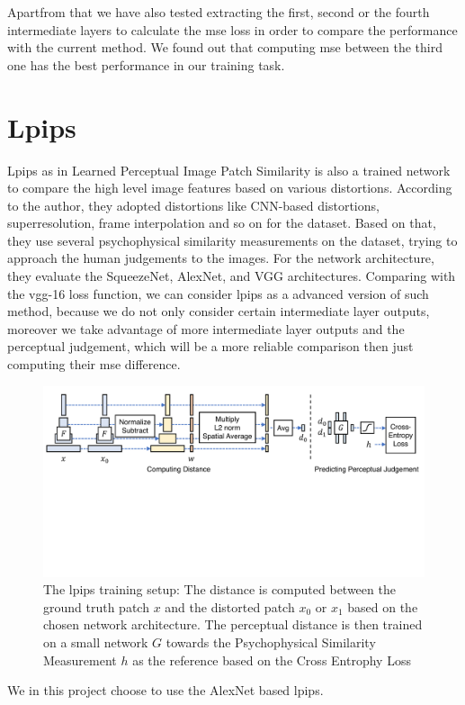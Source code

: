 \documentclass[a4paper,12pt,twoside]{report}
\begin{document}
Apartfrom that we have also tested extracting the first, second or the fourth intermediate layers to calculate the mse loss in order to compare the performance with the current method. We found out that computing mse between the third one has the best performance in our training task.

\section{Lpips}
Lpips as in Learned Perceptual Image Patch Similarity\cite{zhang2018perceptual} is also a trained network to compare the high level image features based on various distortions. According to the author, they adopted distortions like CNN-based distortions, superresolution, frame interpolation and so on for the dataset. Based on that, they use several psychophysical similarity measurements on the dataset, trying to approach the human judgements to the images. For the network architecture, they evaluate the SqueezeNet, AlexNet, and VGG architectures. Comparing with the vgg-16 loss function, we can consider lpips as a advanced version of such method, because we do not only consider certain intermediate layer outputs, moreover we take advantage of more intermediate layer outputs and the perceptual judgement, which will be a more reliable comparison then just computing their mse difference.
\begin{figure}
\centering
\includegraphics[width=1.0\textwidth]{network_lpips.pdf}
\caption{The lpips training setup: The distance is computed between the ground truth patch $x$ and the distorted patch $x_0$ or $x_1$ based on the chosen network architecture. The perceptual distance is then trained on a small network $G$ towards the Psychophysical Similarity Measurement $h$ as the reference based on the Cross Entrophy Loss\cite{zhang2018perceptual}}
\end{figure}
We in this project choose to use the AlexNet based lpips.
\end{document}
